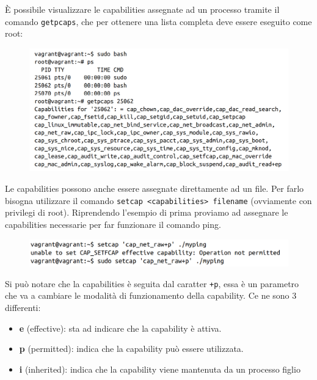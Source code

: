 È possibile visualizzare le capabilities assegnate ad un processo tramite il comando
\verb|getpcaps|, che per ottenere una lista completa deve essere eseguito come root:

\begin{figure}[H]
    \centering
    \includegraphics[width=\textwidth, keepaspectratio]{capitoli/os_security/imgs/cap1.png}
\end{figure}

Le capabilities possono anche essere assegnate direttamente ad un file.
Per farlo bisogna utilizzare il comando \verb|setcap <capabilities> filename|
(ovviamente con privilegi di root). Riprendendo l'esempio di prima proviamo ad
assegnare le capabilities necessarie per far funzionare il comando ping.

\begin{figure}[H]
    \centering
    \includegraphics[width=\textwidth, keepaspectratio]{capitoli/os_security/imgs/cap2.png}
\end{figure}

Si può notare che la capabilities  è seguita dal caratter \verb|+p|, essa è un
parametro che va a cambiare le modalità di funzionamento della capability.
Ce ne sono 3 differenti:

\begin{itemize}
    \item \textbf{e} (effective): sta ad indicare che la capability è attiva.
    \item \textbf{p} (permitted): indica che la capability può essere utilizzata.
    \item \textbf{i} (inherited): indica che la capability viene mantenuta
          da un processo figlio
\end{itemize}

